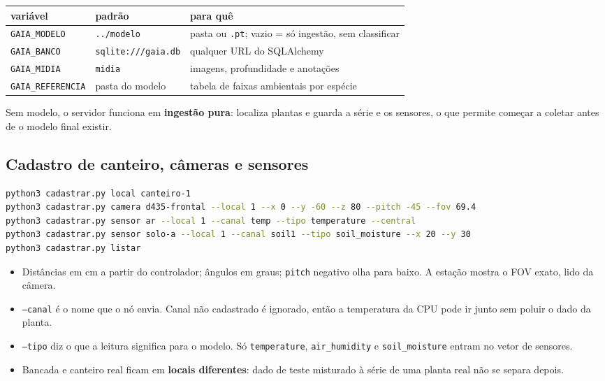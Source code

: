 \documentclass[11pt,a4paper]{article}
\newcommand{\cod}[1]{\texttt{#1}}
\begin{document}
\begin{table}[h]
\centering\small
\begin{tabularx}{\linewidth}{@{}llX@{}}
\toprule
variável & padrão & para quê \\
\midrule
\cod{GAIA\_MODELO} & \cod{../modelo} & pasta ou \cod{.pt}; vazio = só ingestão, sem classificar \\
\cod{GAIA\_BANCO} & \cod{sqlite:///gaia.db} & qualquer URL do SQLAlchemy \\
\cod{GAIA\_MIDIA} & \cod{midia} & imagens, profundidade e anotações \\
\cod{GAIA\_REFERENCIA} & pasta do modelo & tabela de faixas ambientais por espécie \\
\bottomrule
\end{tabularx}
\end{table}

Sem modelo, o servidor funciona em \textbf{ingestão pura}: localiza plantas e guarda
a série e os sensores, o que permite começar a coletar antes de o modelo final
existir.

\subsection{Cadastro de canteiro, câmeras e sensores}
\begin{lstlisting}[language=bash]
python3 cadastrar.py local canteiro-1
python3 cadastrar.py camera d435-frontal --local 1 --x 0 --y -60 --z 80 --pitch -45 --fov 69.4
python3 cadastrar.py sensor ar --local 1 --canal temp --tipo temperature --central
python3 cadastrar.py sensor solo-a --local 1 --canal soil1 --tipo soil_moisture --x 20 --y 30
python3 cadastrar.py listar
\end{lstlisting}
\begin{itemize}
  \item Distâncias em cm a partir do controlador; ângulos em graus; \cod{pitch}
  negativo olha para baixo. A estação mostra o FOV exato, lido da câmera.
  \item \cod{--canal} é o nome que o nó envia. Canal não cadastrado é ignorado, então
  a temperatura da CPU pode ir junto sem poluir o dado da planta.
  \item \cod{--tipo} diz o que a leitura significa para o modelo. Só
  \cod{temperature}, \cod{air\_humidity} e \cod{soil\_moisture} entram no vetor de
  sensores.
  \item Bancada e canteiro real ficam em \textbf{locais diferentes}: dado de teste
  misturado à série de uma planta real não se separa depois.
\end{itemize}
\end{document}
